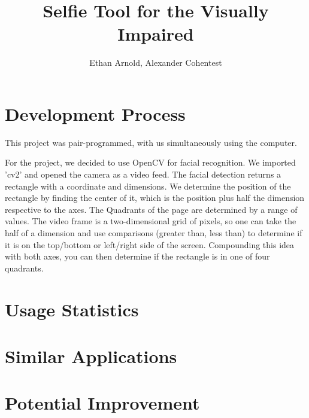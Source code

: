 \documentclass{article}
\title{Selfie Tool for the Visually Impaired}
\author{Ethan Arnold, Alexander Cohentest}
\begin{document}
\maketitle


\section{Development Process}
This project was pair-programmed, with us simultaneously using the computer.


For the project, we decided to use OpenCV for facial recognition.
We imported 'cv2' and opened the camera as a video feed.
The facial detection returns a rectangle with a coordinate and dimensions.
We determine the position of the rectangle by finding the center of it, which is the position plus half the dimension respective to the axes.
The Quadrants of the page are determined by a range of values.
The video frame is a two-dimensional grid of pixels, so one can take the half of a dimension and use comparisons (greater than, less than) to determine if it is on the top/bottom or left/right side of the screen.
Compounding this idea with both axes, you can then determine if the rectangle is in one of four quadrants.



\section{Usage Statistics}
\section{Similar Applications}
\section{Potential Improvement}





\end{document}
